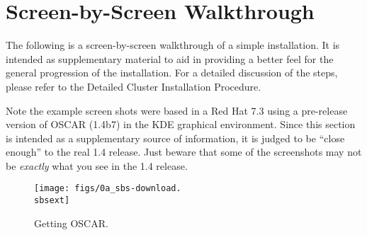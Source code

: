 %
%
%

\newpage

\section{Screen-by-Screen Walkthrough}
\label{app:screen-by-screen}

The following is a screen-by-screen walkthrough of a simple installation.
It is intended as supplementary material to aid in providing a better feel
for the general progression of the installation.  For a detailed discussion
of the steps, please refer to the Detailed Cluster Installation Procedure. 

Note the example screen shots were based in a Red Hat 7.3 using a
pre-release version of OSCAR (1.4b7) in the KDE graphical environment.
Since this section is intended as a supplementary source of
information, it is judged to be ``close enough'' to the real 1.4
release.  Just beware that some of the screenshots may not be {\em
  exactly} what you see in the 1.4 release.



\begin{figure}[htbp]
  \begin{center}
    \centerline{\texttt{[image: figs/0a\_sbs-download.\\sbsext]}}
    \caption{Getting OSCAR.}
    \label{fig:sbs-getting-oscar}
  \end{center}
\end{figure}



